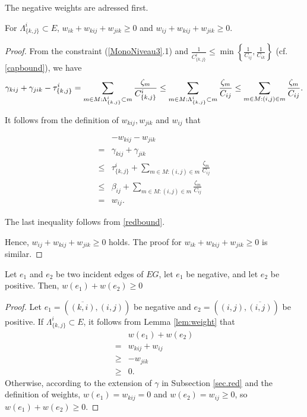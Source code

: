 The negative weights are adressed first.
\begin{lemma}
\label{lem:weight}
For \(  \Lambda^i_{\{k,j\}}\subset E\), \(w_{ik} + w_{kij} + w_{jik} \ge 0\) and \(w_{ij} + w_{kij} + w_{jik}\ge 0\).
\end{lemma}
\begin{proof}
From the constraint (\ref{MonoNiveau3}.1) and  \(\frac{1}{C^i_{\{k,j\}}} \le \min \left \{\frac{1}{ C_{ij}}, \frac{1}{ C_{ik}}\right\}\) (cf. \eqref{capbound}), we have
\begin{equation}
\gamma_{kij} + \gamma_{jik} -  \tau^i_{\{k,j\}} = \sum_{m \in M:  \Lambda^i_{\{k,j\}} \subset m} \frac{\zeta_m}{C^i_{\{k,j\}}}
 \le \sum_{m \in M:  \Lambda^i_{\{k,j\}} \subset m} \frac{\zeta_m}{C_{ij}} \\
  \le \sum_{m \in M: (i,j) \in m} \frac{\zeta_m}{C_{ij}}.
\end{equation}

It follows from the definition of \(w_{kij}, w_{jik} \) and \(w_{ij}\) that

\begin{equation}
\begin{split}
&-w_{kij} - w_{jik}\\
= & \gamma_{kij} + \gamma_{jik} \\
\le &  \tau^i_{\{k,j\}} + \sum_{m \in M:(i,j) \in m}\frac{\zeta_m}{C_{ij}}
 \\
 \le &  \beta_{ij} + \sum_{m \in M:(i,j) \in m}\frac{\zeta_m}{C_{ij}}
 \\
= & w_{ij}.
\end{split}
\end{equation}

The last inequality follows from \eqref{redbound}.

Hence, \(w_{ij} + w_{kij} + w_{jik}\ge 0 \) holds. The proof for \(w_{ik} + w_{kij} + w_{jik}\ge 0 \) is similar.
\end{proof}

\begin{theorem}
\label{lem:alt}
Let \(e_1\) and \(e_2\) be two incident edges of \(EG\), let \(e_1\) be negative, and let \(e_2\) be positive. Then, \(w(e_1) + w(e_2) \ge 0\)
\end{theorem}
\begin{proof}
Let \(e_1=\left(\overline{(k,i)},(i,j)\right)\) be negative and \(e_2 = \left((i,j),\overline{(i,j)}\right)\) be positive. If \( \Lambda^i_{\{k,j\}}\subset E\), it follows from Lemma \eqref{lem:weight} that
\begin{equation}
\begin{split}
& w(e_1) + w(e_2) \\
= & w_{kij} + w_{ij}\\
\ge & -w_{jik}\\
\ge & 0.
\end{split}
\end{equation}
Otherwise, according to the extension of \(\gamma\) in Subsection \ref{sec.red} and the definition of weights, \(w(e_1) = w_{kij} = 0\) and \(w(e_2) =  w_{ij} \ge 0 \), so  \(w(e_1) + w(e_2) \ge 0\).
\end{proof}

